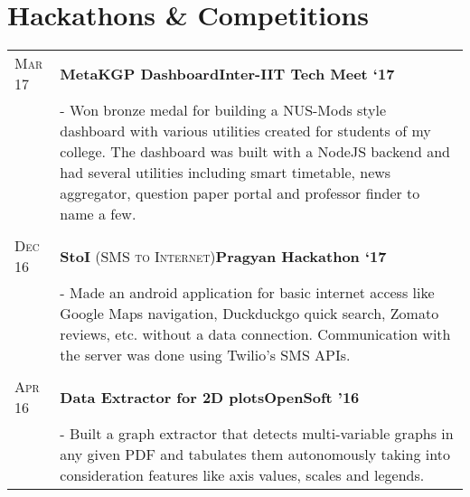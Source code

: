 \documentclass[a4paper,10pt]{extarticle} %
\begin{document}
\section{\textcolor{primary}{Hackathons \& Competitions}}

\begin{tabularx}{\linewidth}{ l | X }

\textsc{Mar 17} & \textbf{MetaKGP Dashboard}\hfill\textbf{Inter-IIT Tech Meet `17}\\
& {- Won bronze medal for building a NUS-Mods style dashboard with various utilities created for students of my college. The dashboard was built with a NodeJS backend and had several utilities including smart timetable, news aggregator, question paper portal and professor finder to name a few.}\\
\multicolumn{2}{c}{} \\

\textsc{Dec 16} & \textbf{StoI} \textsc{(SMS to Internet)}\hfill\textbf{Pragyan Hackathon `17}\\
& {- Made an android application for basic internet access like Google Maps navigation, Duckduckgo quick search, Zomato reviews, etc. without a data connection. Communication with the server was done using Twilio's SMS APIs.}\\
\multicolumn{2}{c}{} \\

\textsc{Apr 16} & \textbf{Data Extractor for 2D plots}\hfill\textbf{OpenSoft '16}\\
& {- Built a graph extractor that detects multi-variable graphs in any given PDF and tabulates them autonomously taking into consideration features like axis values, scales and legends.}\\



\end{tabularx}
\end{document}
